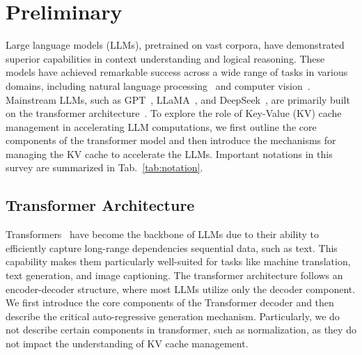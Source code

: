 \section{Preliminary}\label{sec:preliminary}
Large language models (LLMs), pretrained on vast corpora, have demonstrated superior capabilities in context understanding and logical reasoning. 
These models have achieved remarkable success across a wide range of tasks in various domains, including natural language processing~\cite{DBLP:journals/corr/abs-2307-06435, DBLP:journals/csur/MinRSVNSAHR24,xu2024large} 
and 
computer vision~\cite{DBLP:conf/nips/LiuLWL23a,DBLP:journals/pami/ZhangHJL24,DBLP:journals/corr/abs-2306-16410}.
Mainstream LLMs, such as GPT~\cite{bubeck2023sparks}, LLaMA~\cite{DBLP:journals/corr/abs-2302-13971}, and DeepSeek~\cite{DBLP:conf/acl/DaiDZXGCLZYWXLH24}, 
are primarily built on the transformer architecture~\cite{vaswani2017attention}. 
To explore the role of Key-Value (KV) cache management in accelerating LLM computations,
we first outline the core components of the transformer model and then introduce the mechanisms for managing the KV cache
to accelerate the LLMs.
Important notations in this survey are summarized in Tab.~\ref{tab:notation}.




\subsection{Transformer Architecture}\label{ssec:transformer}
Transformers~\cite{vaswani2017attention} have become the backbone of LLMs due to their ability to efficiently capture long-range dependencies sequential data, such as text.
This capability makes them particularly well-suited for tasks like machine translation, text generation, and image captioning.
The transformer architecture follows an encoder-decoder structure, where most LLMs utilize only the decoder component.
We first introduce the core components of the Transformer decoder and then describe the critical auto-regressive generation mechanism. 
Particularly, we do not describe certain components in transformer, such as normalization, as they do not impact the understanding of KV cache management.

